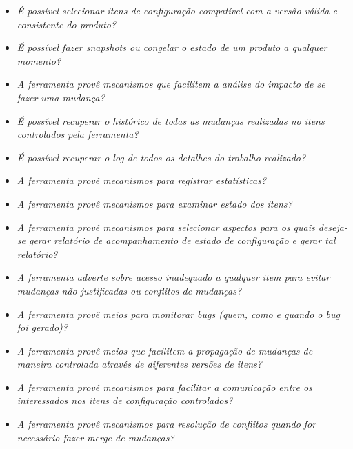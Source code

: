 \begin{itemize}
  \item \textit{É possível selecionar itens de configuração compatível com a versão válida e consistente do
  produto?}
  \item \textit{É possível fazer snapshots ou congelar o estado de um produto a qualquer momento?}
  \item \textit{A ferramenta provê mecanismos que facilitem a análise do impacto de se fazer uma mudança?}
  \item \textit{É possível recuperar o histórico de todas as mudanças realizadas no itens controlados pela
  ferramenta?}
  \item \textit{É possível recuperar o log de todos os detalhes do trabalho realizado?}
  \item \textit{A ferramenta provê mecanismos para registrar estatísticas?}
  \item \textit{A ferramenta provê mecanismos para examinar estado dos itens?}
  \item \textit{A ferramenta provê mecanismos para selecionar aspectos para os quais deseja-se gerar relatório
  de acompanhamento de estado de configuração e gerar tal relatório?}
  \item \textit{A ferramenta adverte sobre acesso inadequado a qualquer item para evitar mudanças não justificadas
  ou conflitos de mudanças?}
  \item \textit{A ferramenta provê meios para monitorar bugs (quem, como e quando o bug foi gerado)?}
  \item \textit{A ferramenta provê meios que facilitem a propagação de mudanças de maneira controlada
  através de diferentes versões de itens?}
  \item \textit{A ferramenta provê mecanismos para facilitar a comunicação entre os interessados nos itens de
  configuração controlados?}
  \item \textit{A ferramenta provê mecanismos para resolução de conflitos quando for necessário fazer merge
  de mudanças?}


\end{itemize}
